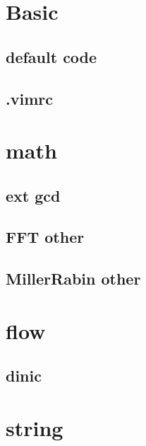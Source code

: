 \documentclass[12pt,twocolumn,oneside]{article}
\begin{document}
\pagestyle{fancy}
\fancyfoot{}
\fancyhead[R]{\thepage}
\renewcommand{\headrulewidth}{0.4pt}
\renewcommand{\contentsname}{Contents} 

\scriptsize
\tableofcontents

\newpage

\section{Basic}
\subsection{default code}


\subsection{.vimrc}


\section{math}
\subsection{ext gcd}


\subsection{FFT other}


\subsection{MillerRabin other}


\section{flow}
\subsection{dinic}


\section{string}
\end{document}
